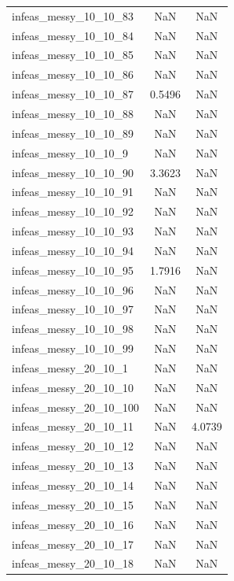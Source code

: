 \begin{longtable}{lcc}
infeas\_messy\_10\_10\_83  &      NaN &     NaN \\
infeas\_messy\_10\_10\_84  &      NaN &     NaN \\
infeas\_messy\_10\_10\_85  &      NaN &     NaN \\
infeas\_messy\_10\_10\_86  &      NaN &     NaN \\
infeas\_messy\_10\_10\_87  &   0.5496 &     NaN \\
infeas\_messy\_10\_10\_88  &      NaN &     NaN \\
infeas\_messy\_10\_10\_89  &      NaN &     NaN \\
infeas\_messy\_10\_10\_9   &      NaN &     NaN \\
infeas\_messy\_10\_10\_90  &   3.3623 &     NaN \\
infeas\_messy\_10\_10\_91  &      NaN &     NaN \\
infeas\_messy\_10\_10\_92  &      NaN &     NaN \\
infeas\_messy\_10\_10\_93  &      NaN &     NaN \\
infeas\_messy\_10\_10\_94  &      NaN &     NaN \\
infeas\_messy\_10\_10\_95  &   1.7916 &     NaN \\
infeas\_messy\_10\_10\_96  &      NaN &     NaN \\
infeas\_messy\_10\_10\_97  &      NaN &     NaN \\
infeas\_messy\_10\_10\_98  &      NaN &     NaN \\
infeas\_messy\_10\_10\_99  &      NaN &     NaN \\
infeas\_messy\_20\_10\_1   &      NaN &     NaN \\
infeas\_messy\_20\_10\_10  &      NaN &     NaN \\
infeas\_messy\_20\_10\_100 &      NaN &     NaN \\
infeas\_messy\_20\_10\_11  &      NaN &  4.0739 \\
infeas\_messy\_20\_10\_12  &      NaN &     NaN \\
infeas\_messy\_20\_10\_13  &      NaN &     NaN \\
infeas\_messy\_20\_10\_14  &      NaN &     NaN \\
infeas\_messy\_20\_10\_15  &      NaN &     NaN \\
infeas\_messy\_20\_10\_16  &      NaN &     NaN \\
infeas\_messy\_20\_10\_17  &      NaN &     NaN \\
infeas\_messy\_20\_10\_18  &      NaN &     NaN \\

\end{longtable}
